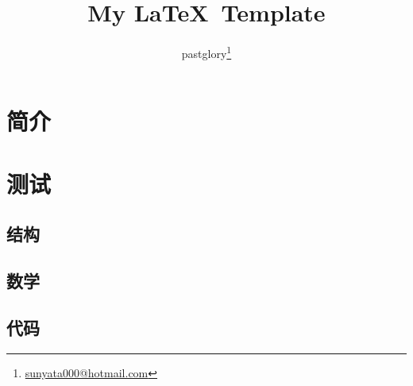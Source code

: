 \documentclass[zh, a4paper, 12pt]{pgreport}
\title {My \LaTeX\ Template}
\author{pastglory\thanks{\href{mailto:sunyata000@hotmail.com}{sunyata000@hotmail.com}}}
\date{}
\begin{document}
\maketitle
\tableofcontents
\begin{abstract}

\end{abstract}

\section{简介}


\section{测试}

\subsection{结构}


\subsection{数学}


\subsection{代码}



\end{document}
